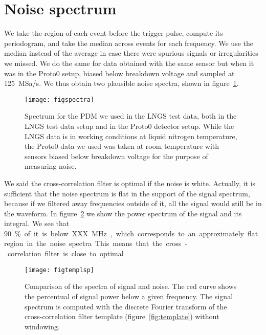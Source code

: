 \section{Noise spectrum}
\label{sec:spectrum}

We take the region of each event before the trigger pulse, compute its
periodogram, and take the median across events for each frequency. We use the
median instead of the average in case there were spurious signals or
irregularities we missed. We do the same for data obtained with the same sensor
but when it was in the Proto0 setup, biased below breakdown voltage and sampled
at \SI{125}{MSa/s}. We thus obtain two plausible noise spectra, shown in
figure~\ref{fig:spectra}.


\begin{figure}
    \hspace{-0.28\textwidth}
    \texttt{[image: figspectra]}
    
    \caption{Spectrum for the PDM we used in the LNGS test data, both in the
    LNGS test data setup and in the Proto0 detector setup. While the LNGS data
    is in working conditions at liquid nitrogen temperature, the Proto0 data we
    used was taken at room temperature with sensors biased below breakdown
    voltage for the purpose of measuring noise.}
    
    \label{fig:spectra}
\end{figure}

We said the cross-correlation filter is optimal if the noise is white.
Actually, it is sufficient that the noise spectrum is flat in the support of
the signal spectrum, because if we filtered away frequencies outside of it, all
the signal would still be in the waveform. In figure~\ref{fig:templsp} we show
the power spectrum of the signal and its integral. We see that \SI{90}\% of it
is below XXX~\si{MHz}, which corresponds to an approximately flat region in the
noise spectra. This means that the cross-correlation filter is close to
optimal. 

\begin{figure}
    \hspace{0.00\textwidth}
    \texttt{[image: figtemplsp]}
    
    \caption{Comparison of the spectra of signal and noise. The red curve shows
    the percentual of signal power below a given frequency. The signal spectrum
    is computed with the discrete Fourier transform of the cross-correlation
    filter template (figure~\ref{fig:template}) without windowing.}
    
    \label{fig:templsp}
\end{figure}

